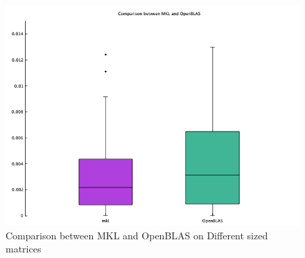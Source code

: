 \documentclass{article}
\begin{document}
\begin{figure}[h]
\centering
\includegraphics[scale=0.4]{2.png}
\caption{Comparison between MKL and OpenBLAS on Different sized matrices}
\label{fig:2.png}
\end{figure}
\end{document}
